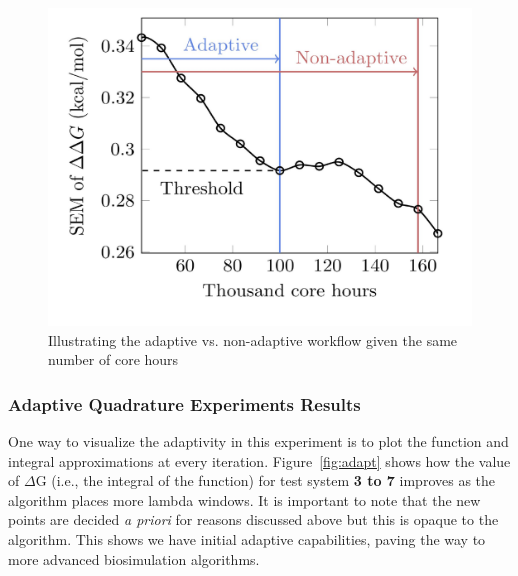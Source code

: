 \begin{figure}
  \centering
    \includegraphics[width=\columnwidth]{figures/adaptive_vs_nonadaptive_pseudo.pdf}
    \caption{Illustrating the adaptive vs. non-adaptive workflow given the
    same number of core hours}
\label{fig:adaptive_vs_nonadaptive_TIES}
\end{figure}

\subsubsection{Adaptive Quadrature Experiments Results}


One way to visualize the adaptivity in this experiment is to plot the
function and integral approximations at every iteration.
Figure~\ref{fig:adapt} shows how the value of $\Delta$G (i.e., the integral
of the function) for test system \textbf{3 to 7}  improves as the
algorithm places more lambda windows. It is important to note that the new
points are decided {\it a priori} for reasons discussed above but this is
opaque to the algorithm. This shows we have initial adaptive capabilities,
paving the way to more advanced biosimulation algorithms.

